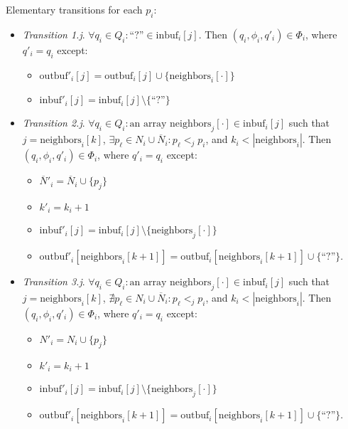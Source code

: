 Elementary transitions for each $p_i$:
\begin{itemize}
\item \emph{Transition 1.j}. $\forall q_i \in Q_i: \text{``?''} \in \text{inbuf}_i[j]$.
      Then $(q_i, \phi_i, q'_i) \in \Phi_i$,
      where $q'_i = q_i$ except:
      \begin{itemize}
      \item $\text{outbuf}'_i[j] = \text{outbuf}_i[j] \cup \{\text{neighbors}_i[\cdot]\}$
      \item $\text{inbuf}'_i[j] = \text{inbuf}_i[j] \setminus \text{\{``?''\}}$
      \end{itemize}
\item \emph{Transition 2.j}. $\forall q_i \in Q_i: \text{an array neighbors}_j[\cdot] \in \text{inbuf}_i[j]$
      such that $j = \text{neighbors}_i[k]$,
      $\exists p_{\ell} \in N_i \cup \overline{N}_i: p_{\ell} <_j p_i$,
      and $k_i < |\text{neighbors}_i|$.
      Then $(q_i, \phi_i, q'_i) \in \Phi_i$,
      where $q'_i = q_i$ except:
      \begin{itemize}
      \item $\overline{N}'_i = \overline{N}_i \cup \{ p_j \}$
      \item $k'_i = k_i + 1$
      \item $\text{inbuf}'_i[j] = \text{inbuf}_i[j] \setminus \{\text{neighbors}_j[\cdot]\}$
      \item $\text{outbuf}'_i[\text{neighbors}_i[k + 1]] =
             \text{outbuf}_i[\text{neighbors}_i[k + 1]] \cup \text{\{``?''\}}$.
      \end{itemize}
\item \emph{Transition 3.j}. $\forall q_i \in Q_i: \text{an array neighbors}_j[\cdot] \in \text{inbuf}_i[j]$
      such that $j = \text{neighbors}_i[k]$,
      $\nexists p_{\ell} \in N_i \cup \overline{N}_i: p_{\ell} <_j p_i$,
      and $k_i < |\text{neighbors}_i|$.
      Then $(q_i, \phi_i, q'_i) \in \Phi_i$,
      where $q'_i = q_i$ except:
      \begin{itemize}
      \item $N'_i = N_i \cup \{ p_j \}$
      \item $k'_i = k_i + 1$
      \item $\text{inbuf}'_i[j] = \text{inbuf}_i[j] \setminus \{\text{neighbors}_j[\cdot]\}$
      \item $\text{outbuf}'_i[\text{neighbors}_i[k + 1]] =
             \text{outbuf}_i[\text{neighbors}_i[k + 1]] \cup \{\text{``?''}\}$.
      \end{itemize}

\end{itemize}
